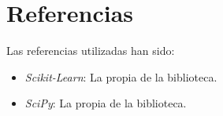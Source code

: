 \documentclass[a4paper, 11pt]{article}
\begin{document}
  \newpage
  \section{Referencias}

  Las referencias utilizadas han sido:
  \begin{itemize}
    \item \emph{Scikit-Learn}: La propia  de la biblioteca.
    \item \emph{SciPy}: La propia  de la biblioteca.
  \end{itemize}
\end{document}
